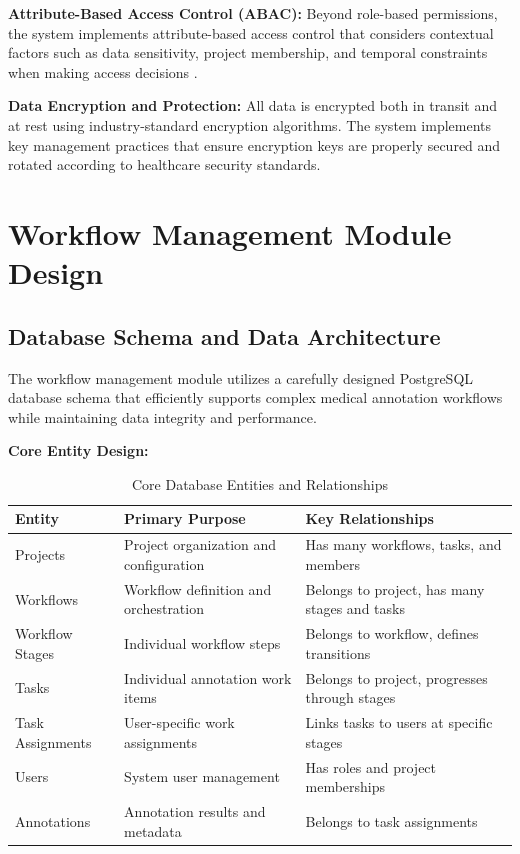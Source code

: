 \textbf{Attribute-Based Access Control (ABAC):} Beyond role-based permissions, the system implements attribute-based access control that considers contextual factors such as data sensitivity, project membership, and temporal constraints when making access decisions \cite{hu2014guide}.

\textbf{Data Encryption and Protection:} All data is encrypted both in transit and at rest using industry-standard encryption algorithms. The system implements key management practices that ensure encryption keys are properly secured and rotated according to healthcare security standards.

\section{Workflow Management Module Design}

\subsection{Database Schema and Data Architecture}

The workflow management module utilizes a carefully designed PostgreSQL database schema that efficiently supports complex medical annotation workflows while maintaining data integrity and performance.

\textbf{Core Entity Design:}

\begin{table}[htbp]
\centering
\caption{Core Database Entities and Relationships}
\label{tab:database-entities}
\begin{tabular}{|p{3cm}|p{4cm}|p{7cm}|}
\hline
\textbf{Entity} & \textbf{Primary Purpose} & \textbf{Key Relationships} \\
\hline
Projects & Project organization and configuration & Has many workflows, tasks, and members \\
\hline
Workflows & Workflow definition and orchestration & Belongs to project, has many stages and tasks \\
\hline
Workflow Stages & Individual workflow steps & Belongs to workflow, defines transitions \\
\hline
Tasks & Individual annotation work items & Belongs to project, progresses through stages \\
\hline
Task Assignments & User-specific work assignments & Links tasks to users at specific stages \\
\hline
Users & System user management & Has roles and project memberships \\
\hline
Annotations & Annotation results and metadata & Belongs to task assignments \\
\hline
\end{tabular}
\end{table}

